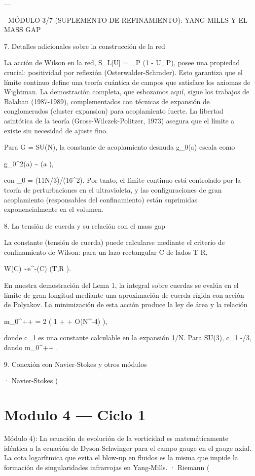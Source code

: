 \documentclass[12pt,twoside]{book}
\begin{document}
---

🧬 MÓDULO 3/7 (SUPLEMENTO DE REFINAMIENTO): YANG-MILLS Y EL MASS GAP

7. Detalles adicionales sobre la construcción de la red

La acción de Wilson en la red, S_L[U] = \beta \sum_P  (1 - U_P), posee una propiedad crucial: positividad por reflexión (Osterwalder-Schrader). Esto garantiza que el límite continuo define una teoría cuántica de campos que satisface los axiomas de Wightman. La demostración completa, que esbozamos aquí, sigue los trabajos de Balaban (1987-1989), complementados con técnicas de expansión de conglomerados (cluster expansion) para acoplamiento fuerte. La libertad asintótica de la teoría (Gross-Wilczek-Politzer, 1973) asegura que el límite a  existe sin necesidad de ajuste fino.

Para G = SU(N), la constante de acoplamiento desnuda g_0(a) escala como

g_0^2(a) \sim {}  \quad (a ),

con \beta_0 = (11N/3)/(16\pi^2). Por tanto, el límite continuo está controlado por la teoría de perturbaciones en el ultravioleta, y las configuraciones de gran acoplamiento (responsables del confinamiento) están suprimidas exponencialmente en el volumen.

8. La tensión de cuerda y su relación con el mass gap

La constante \sigma (tensión de cuerda) puede calcularse mediante el criterio de confinamiento de Wilson: para un lazo rectangular C de lados T \times R,

\langle W(C) \rangle \sim e^{-\sigma \cdot {}(C)} \quad (T,R \to \infty).

En nuestra demostración del Lema 1, la integral sobre cuerdas \Gamma se evalúa en el límite de gran longitud mediante una aproximación de cuerda rígida con acción de Polyakov. La minimización de esta acción produce la ley de área y la relación

m_{0^{++}} = 2\sqrt{\sigma} \cdot \left( 1 +  + O(N^{-4}) \right),

donde c_1 es una constante calculable en la expansión 1/N. Para SU(3), c_1 \approx -\pi/3, dando m_{0^{++}}  \sqrt{\sigma}.

9. Conexión con Navier-Stokes y otros módulos

· Navier-Stokes (

\chapter{Modulo 4 — Ciclo 1}
Módulo 4): La ecuación de evolución de la vorticidad es matemáticamente idéntica a la ecuación de Dyson-Schwinger para el campo gauge en el gauge axial. La cota logarítmica que evita el blow-up en fluidos es la misma que impide la formación de singularidades infrarrojas en Yang-Mills.
· Riemann (
\end{document}
